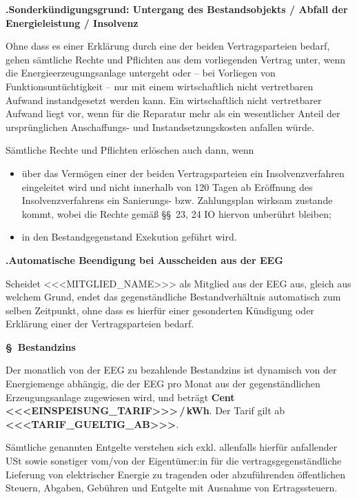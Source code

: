 \documentclass[a4paper,11pt]{article}
\newcounter{parasec}
\newcounter{parasubsec}[parasec]
\newcommand{\parasec}[1]{%
  \stepcounter{parasec}%
  \setcounter{parasubsec}{0}%
  \par\Needspace*{5\baselineskip}%
  \bigskip
  {\large\bfseries\color{tuerkis}\S\ \theparasec\quad #1}\par\nopagebreak
  \smallskip\nopagebreak
}
\newcommand{\parasubsec}[1]{%
  \stepcounter{parasubsec}%
  \par\Needspace*{4\baselineskip}%
  \medskip
  {\bfseries\color{tuerkis}\theparasec.\theparasubsec\quad #1}\par\nopagebreak
  \smallskip\nopagebreak
}
\begin{document}
\parasubsec{Sonderkündigungsgrund: Untergang des Bestandsobjekts / Abfall der Energieleistung / Insolvenz}

Ohne dass es einer Erklärung durch eine der beiden Vertragsparteien bedarf, gehen sämtliche Rechte und Pflichten aus dem vorliegenden Vertrag unter, wenn die Energieerzeugungsanlage untergeht oder -- bei Vorliegen von Funktionsuntüchtigkeit -- nur mit einem wirtschaftlich nicht vertretbaren Aufwand instandgesetzt werden kann. Ein wirtschaftlich nicht vertretbarer Aufwand liegt vor, wenn für die Reparatur mehr als ein wesentlicher Anteil der ursprünglichen Anschaffungs- und Instandsetzungskosten anfallen würde.

Sämtliche Rechte und Pflichten erlöschen auch dann, wenn

\begin{itemize}
  \item über das Vermögen einer der beiden Vertragsparteien ein Insolvenzverfahren eingeleitet wird und nicht innerhalb von 120 Tagen ab Eröffnung des Insolvenzverfahrens ein Sanierungs- bzw. Zahlungsplan wirksam zustande kommt, wobei die Rechte gemäß \S\S\ 23, 24 IO hiervon unberührt bleiben;
  \item in den Bestandgegenstand Exekution geführt wird.
\end{itemize}

\parasubsec{Automatische Beendigung bei Ausscheiden aus der EEG}

Scheidet <<<MITGLIED_NAME>>> als Mitglied aus der EEG aus, gleich aus welchem Grund, endet das gegenständliche Bestandverhältnis automatisch zum selben Zeitpunkt, ohne dass es hierfür einer gesonderten Kündigung oder Erklärung einer der Vertragsparteien bedarf.

\parasec{Bestandzins}

Der monatlich von der EEG zu bezahlende Bestandzins ist dynamisch von der Energiemenge abhängig, die der EEG pro Monat aus der gegenständlichen Erzeugungsanlage zugewiesen wird, und beträgt \textbf{Cent <<<EINSPEISUNG_TARIF>>>\,/\,kWh}. Der Tarif gilt ab \textbf{<<<TARIF_GUELTIG_AB>>>}.

Sämtliche genannten Entgelte verstehen sich exkl. allenfalls hierfür anfallender USt sowie sonstiger vom/von der Eigentümer:in für die vertragsgegenständliche Lieferung von elektrischer Energie zu tragenden oder abzuführenden öffentlichen Steuern, Abgaben, Gebühren und Entgelte mit Ausnahme von Ertragssteuern.
\end{document}
